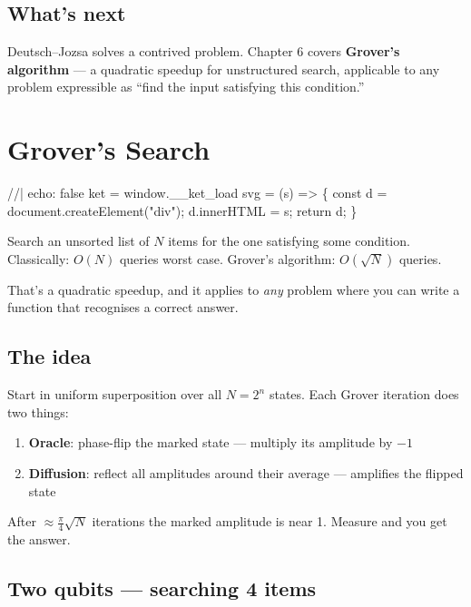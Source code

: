 \documentclass[
  11pt,
  letterpaper,
  oneside]{scrbook}
\newenvironment{Shaded}{\begin{snugshade}}{\end{snugshade}}
\newcommand{\NormalTok}[1]{\textcolor[rgb]{0.00,0.23,0.31}{#1}}
\providecommand{\tightlist}{%
  \setlength{\itemsep}{0pt}\setlength{\parskip}{0pt}}
\begin{document}
\section{What's next}\label{whats-next-4}

Deutsch--Jozsa solves a contrived problem. Chapter 6 covers
\textbf{Grover's algorithm} --- a quadratic speedup for unstructured
search, applicable to any problem expressible as ``find the input
satisfying this condition.''

\chapter{Grover's Search}\label{sec-grover}

\begin{Shaded}
\begin{Highlighting}[]
\NormalTok{//| echo: false}
\NormalTok{ket = window.\_\_ket\_load}
\NormalTok{svg = (s) =\textgreater{} \{ const d = document.createElement("div"); d.innerHTML = s; return d; \}}
\end{Highlighting}
\end{Shaded}

Search an unsorted list of \(N\) items for the one satisfying some
condition. Classically: \(O(N)\) queries worst case. Grover's algorithm:
\(O(\sqrt{N})\) queries.

That's a quadratic speedup, and it applies to \emph{any} problem where
you can write a function that recognises a correct answer.

\section{The idea}\label{the-idea}

Start in uniform superposition over all \(N = 2^n\) states. Each Grover
iteration does two things:

\begin{enumerate}
\def\labelenumi{\arabic{enumi}.}
\tightlist
\item
  \textbf{Oracle}: phase-flip the marked state --- multiply its
  amplitude by \(-1\)
\item
  \textbf{Diffusion}: reflect all amplitudes around their average ---
  amplifies the flipped state
\end{enumerate}

After \(\approx \frac{\pi}{4}\sqrt{N}\) iterations the marked amplitude
is near 1. Measure and you get the answer.

\section{Two qubits --- searching 4
items}\label{two-qubits-searching-4-items}
\end{document}
